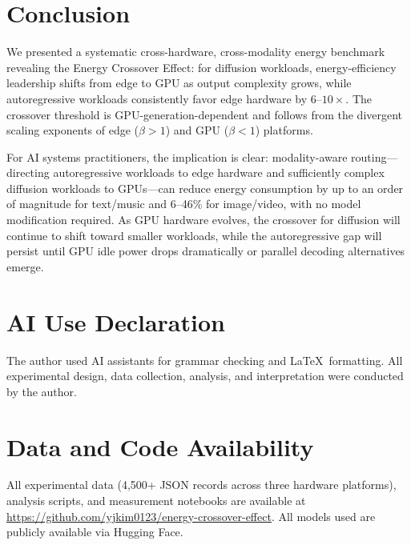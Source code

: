 \documentclass[acmlarge,manuscript,screen,review]{acmart}
\begin{document}
\section{Conclusion}
\label{sec:conclusion}

We presented a systematic cross-hardware, cross-modality energy benchmark revealing the Energy Crossover Effect: for diffusion workloads, energy-efficiency leadership shifts from edge to GPU as output complexity grows, while autoregressive workloads consistently favor edge hardware by $6$--$10\times$. The crossover threshold is GPU-generation-dependent and follows from the divergent scaling exponents of edge ($\beta > 1$) and GPU ($\beta < 1$) platforms.

For AI systems practitioners, the implication is clear: modality-aware routing---directing autoregressive workloads to edge hardware and sufficiently complex diffusion workloads to GPUs---can reduce energy consumption by up to an order of magnitude for text/music and 6--46\% for image/video, with no model modification required. As GPU hardware evolves, the crossover for diffusion will continue to shift toward smaller workloads, while the autoregressive gap will persist until GPU idle power drops dramatically or parallel decoding alternatives emerge.

\section*{AI Use Declaration}

The author used AI assistants for grammar checking and \LaTeX\ formatting. All experimental design, data collection, analysis, and interpretation were conducted by the author.

\section*{Data and Code Availability}

All experimental data (4,500+ JSON records across three hardware platforms), analysis scripts, and measurement notebooks are available at \url{https://github.com/yjkim0123/energy-crossover-effect}. All models used are publicly available via Hugging Face.
\end{document}
